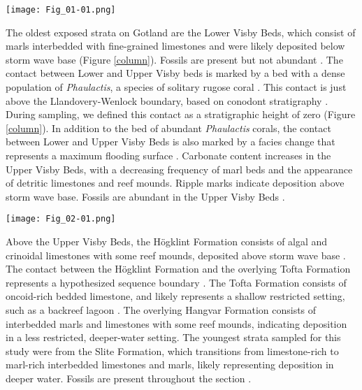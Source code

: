 \documentclass[5p, authoryear]{elsarticle}
\begin{document}
\begin{figure*}[t]
\centering
\texttt{[image: Fig\_01-01.png]}
\caption{Geologic map of the northern half of the island of Gotland, Sweden, modified from \cite{Calner2004a}. Approximate sample locations are marked and labeled with location number, which corresponds to the sample locations in the supplementary table.}
\label{map}
\end{figure*}

The oldest exposed strata on Gotland are the Lower Visby Beds, which consist of marls interbedded with fine-grained limestones and were likely deposited below storm wave base (Figure \ref{column}). Fossils are present but not abundant \citep{Calner2004a,Samtleben1996}. The contact between Lower and Upper Visby beds is marked by a bed with a dense population of \textit{Phaulactis}, a species of solitary rugose coral \citep{Jeppsson1997,Jeppsson2006,Munnecke2003,Samtleben1996}. This contact is just above the Llandovery-Wenlock boundary, based on conodont stratigraphy \citep{Aldridge1993,Jeppsson1983,Mabillard1985}. During sampling, we defined this contact as a stratigraphic height of zero (Figure \ref{column}). In addition to the bed of abundant \textit{Phaulactis} corals, the contact between Lower and Upper Visby Beds is also marked by a facies change that represents a maximum flooding surface \citep{Calner2004b}. Carbonate content increases in the Upper Visby Beds, with a decreasing frequency of marl beds and the appearance of detritic limestones and reef mounds. Ripple marks indicate deposition above storm wave base. Fossils are abundant in the Upper Visby Beds \citep{Calner2004a,Samtleben1996}. 

\begin{figure*}[t]
\centering
\texttt{[image: Fig\_02-01.png]}
\caption{Lithology and isotope stratigraphy of the sampled sequence. On the left, the stratigraphic column shows the generalized lithostratigraphic units that were sampled for this study. On the right are the carbon and oxygen isotopic compositions of apparently well-preserved brachiopods, collected from the same section in Gotland by \cite{Bickert1997}. Figure modified from \cite{Bickert1997}.}
\label{column}
\end{figure*}

Above the Upper Visby Beds, the H\"{o}gklint Formation consists of algal and crinoidal limestones with some reef mounds, deposited above storm wave base \citep{Riding1991,Samtleben1996,Watts2000}. The contact between the H\"{o}gklint Formation and the overlying Tofta Formation represents a hypothesized sequence boundary \citep{Calner2004b}. The Tofta Formation consists of oncoid-rich bedded limestone, and likely represents a shallow restricted setting, such as a backreef lagoon \citep{Riding1991,Samtleben1996}. The overlying Hangvar Formation consists of interbedded marls and limestones with some reef mounds, indicating deposition in a less restricted, deeper-water setting. The youngest strata sampled for this study were from the Slite Formation, which transitions from limestone-rich to marl-rich interbedded limestones and marls, likely representing deposition in deeper water. Fossils are present throughout the section \citep{Calner2004a}. 
\end{document}
